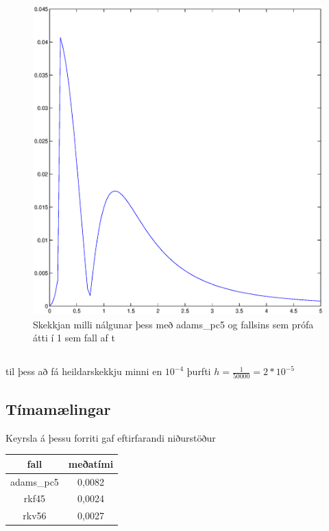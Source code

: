\documentclass[a4]{article}
\begin{document}
\begin{figure}[h]
  \begin{center}
    \includegraphics[scale=0.5]{adamspc5err.eps}
  \end{center}
  \caption{Skekkjan milli nálgunar þess með adams\_pc5 og fallsins sem prófa átti í 1 sem fall af t}
  \label{fig:adamspc5err}
\end{figure}
\subsection{}
til þess að fá heildarskekkju minni en $10^{-4}$ þurfti $h=\frac{1}{50000}=2*10^{-5}$

\subsection{Tímamælingar}

Keyrsla á þessu forriti gaf eftirfarandi niðurstöður\\
\begin{tabular}{|c|c|}
\hline
fall		&meðatími \\\hline
adams\_pc5	&0,0082\\\hline
rkf45		&0,0024\\\hline
rkv56		&0,0027\\\hline
\end{tabular}
\end{document}

